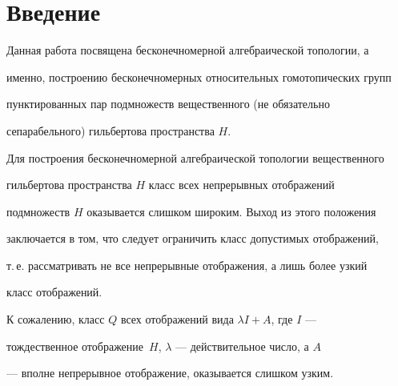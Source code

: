 \date{} 




\pagestyle{plain} %


 




\maketitle 


\label{begin} 


 


 


\section*{Введение} 


 


Данная работа посвящена бесконечномерной алгебраической топологии, а 


именно, построению бесконечномерных относительных гомотопических групп 


пунктированных пар подмножеств вещественного (не обязательно 


сепарабельного) гильбертова пространства $H$. 


 


Для построения бесконечномерной алгебраической топологии вещественного 


гильбертова пространства $H$ класс всех непрерывных отображений 


подмножеств $H$ оказывается слишком широким. Выход из этого положения 


заключается в том, что следует ограничить класс допустимых отображений, 


т.\,е. рассматривать не все непрерывные отображения, а лишь более узкий 


класс отображений. 


 


К сожалению, класс $Q$ всех отображений вида $\lambda I+A$, где $I$ --- 


тождественное отображение~$H$, $\lambda$ --- действительное число, а $A$ 


--- вполне непрерывное отображение, оказывается слишком узким. 


